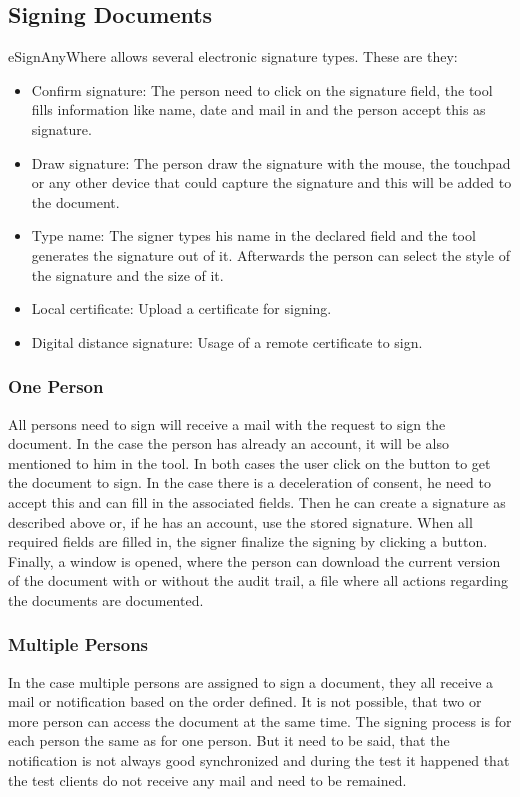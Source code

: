 \subsection{Signing Documents}
eSignAnyWhere allows several electronic signature types. These are they:
\begin{itemize}
	\item Confirm signature: The person need to click on the signature field, the tool fills information like name, date and mail in and the person accept this as signature.
	\item Draw signature: The person draw the signature with the mouse, the touchpad or any other device that could capture the signature and this will be added to the document.
	\item Type name: The signer types his name in the declared field and the tool generates the signature out of it. Afterwards the person can select the style of the signature and the size of it.
	\item Local certificate: Upload a certificate for signing.
	\item Digital distance signature: Usage of a remote certificate to sign.
\end{itemize}

\subsubsection{One Person}
All persons need to sign will receive a mail with the request to sign the document. In the case the person has already an account, it will be also mentioned to him in the tool. In both cases the user click on the button to get the document to sign. In the case there is a deceleration of consent, he need to accept this and can fill in the associated fields. Then he can create a signature as described above or, if he has an account, use the stored signature. When all required fields are filled in, the signer finalize the signing by clicking a button. Finally, a window is opened, where the person can download the current version of the document with or without the audit trail, a file where all actions regarding the documents are documented. 

\subsubsection{Multiple Persons}
In the case multiple persons are assigned to sign a document, they all receive a mail or notification based on the order defined. It is not possible, that two or more person can access the document at the same time. The signing process is for each person the same as for one person. But it need to be said, that the notification is not always good synchronized and during the test it happened that the test clients do not receive any mail and need to be remained.

